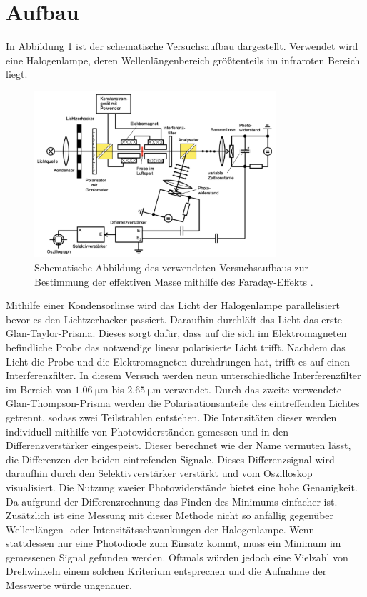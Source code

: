 \section{Aufbau}
In Abbildung \ref{fig:schemAufbau} ist der schematische Versuchsaufbau dargestellt. Verwendet wird
eine Halogenlampe, deren Wellenlängenbereich größtenteils im infraroten Bereich liegt.
\begin{figure}[H]
    \centering
    \includegraphics[width=0.8\textwidth]{images/SchemAufbau.pdf}
    \caption{Schematische Abbildung des verwendeten Versuchsaufbaus zur Bestimmung der effektiven
     Masse mithilfe des Faraday-Effekts \cite{anleitung}.}
    \label{fig:schemAufbau}
\end{figure} \noindent
Mithilfe einer Kondensorlinse wird das Licht der Halogenlampe parallelisiert bevor es den Lichtzerhacker passiert.
Daraufhin durchläft das Licht das erste Glan-Taylor-Prisma. Dieses sorgt dafür, dass auf die sich im
Elektromagneten befindliche Probe das notwendige linear polarisierte Licht trifft. 
Nachdem das Licht die Probe und die Elektromagneten durchdrungen hat, trifft es auf einen Interferenzfilter.
In diesem Versuch werden neun unterschiedliche Interferenzfilter im Bereich von $\SI{1.06}{\micro\meter}$ bis $\SI{2.65}{\micro\meter}$
verwendet. Durch das zweite verwendete Glan-Thompson-Prisma werden die Polarisationsanteile des 
eintreffenden Lichtes getrennt, sodass zwei Teilstrahlen entstehen. Die Intensitäten dieser werden
individuell mithilfe von Photowiderständen gemessen und in den Differenzverstärker eingespeist. Dieser 
berechnet wie der Name vermuten lässt, die Differenzen der beiden eintrefenden Signale. Dieses
Differenzsignal wird daraufhin durch den Selektivverstärker verstärkt und vom Oszilloskop visualisiert. 
Die Nutzung zweier Photowiderstände bietet eine hohe Genauigkeit. Da aufgrund der Differenzrechnung das
Finden des Minimums einfacher ist. Zusätzlich ist eine Messung mit dieser Methode nicht so anfällig
gegenüber Wellenlängen- oder Intensitätsschwankungen der Halogenlampe.
Wenn stattdessen nur eine Photodiode zum Einsatz kommt, muss ein Minimum im gemessenen Signal gefunden 
werden. Oftmals würden jedoch eine Vielzahl von Drehwinkeln einem solchen Kriterium entsprechen 
und die Aufnahme der Messwerte würde ungenauer. 

